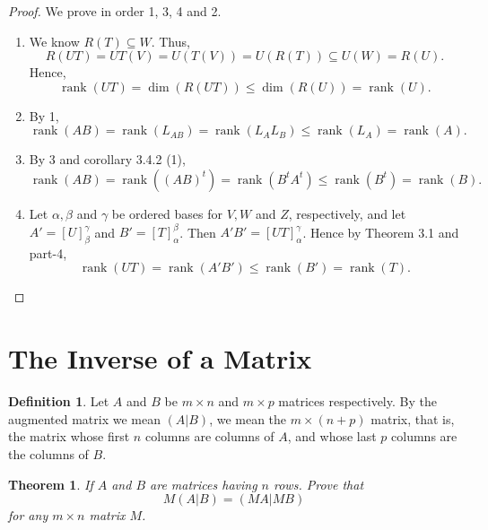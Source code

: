 \documentclass[12pt, a4paper]{article}
\newtheorem{theorem}{Theorem}[section]
\theoremstyle{definition}
\newtheorem{definition}{Definition}[section]
\theoremstyle{remark}
\DeclareMathOperator{\rank}{rank}
\begin{document}
\begin{proof}
We prove in order 1, 3, 4 and 2.
\begin{enumerate}
    \item We know $R(T) \subseteq W$. Thus,
    \[
    R(UT) = UT(V) = U(T(V)) = U(R(T)) \subseteq U(W) = R(U).
    \]
    Hence,
    \[
    \rank(UT) = \dim(R(UT)) \le \dim(R(U)) = \rank(U).
    \]

    \item[\text{3.}] By 1,
    \[
    \rank(AB) = \rank(L_{AB}) = \rank(L_A L_B) \le \rank(L_A) = \rank(A).
    \]

    \item[\text{4.}] By 3 and corollary 3.4.2 (1),
    \[
    \rank(AB) = \rank((AB)^t) = \rank(B^t A^t) \le \rank(B^t) = \rank(B).
    \]

    \item[\text{2.}] Let $\alpha, \beta$ and $\gamma$ be ordered bases for $V, W$ and $Z$, respectively, and let $A' = [U]_\beta^\gamma$ and $B' = [T]_{\alpha}^\beta$. Then $A'B' = [UT]_\alpha^\gamma$. Hence by Theorem 3.1 and part-4,
    \[
    \rank(UT) = \rank(A'B') \le \rank(B') = \rank(T).
    \]
\end{enumerate}
\end{proof}

\section{The Inverse of a Matrix}

\begin{definition}
    Let $A$ and $B$ be $m \times n$ and $m \times p$ matrices respectively. By the augmented matrix we mean $(A|B)$, we mean the $m \times (n+p)$ matrix, that is, the matrix whose first $n$ columns are columns of $A$, and whose last $p$ columns are the columns of $B$.
\end{definition}

\begin{theorem}
If $A$ and $B$ are matrices having $n$ rows. Prove that
\[
M(A|B) = (MA|MB)
\]
for any $m \times n$ matrix $M$.
\end{theorem}
\end{document}
